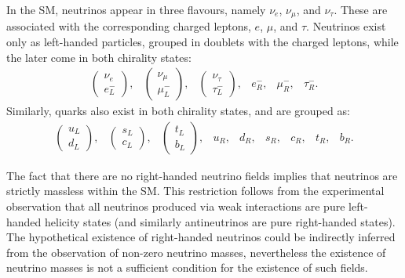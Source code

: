In the SM, neutrinos appear in three flavours, namely $\nu_{e}$, $\nu_{\mu}$, and $\nu_{\tau}$. These are associated with the corresponding charged leptons, $e$, $\mu$, and $\tau$. Neutrinos exist only as left-handed particles, grouped in doublets with the charged leptons, while the later come in both chirality states:
\begin{equation}
	\begin{array}{cccccc}
		\begin{pmatrix}\nu_{e}\\e^{-}_{L}\end{pmatrix},&\begin{pmatrix}\nu_{\mu}\\\mu^{-}_{L}\end{pmatrix},&\begin{pmatrix}\nu_{\tau}\\\tau^{-}_{L}\end{pmatrix},&e^{-}_{R},&\mu^{-}_{R},&\tau^{-}_{R}.
	\end{array}
\end{equation}
Similarly, quarks also exist in both chirality states, and are grouped as:
\begin{equation}
	\begin{array}{ccccccccc}
		\begin{pmatrix}u_{L}\\d_{L}\end{pmatrix},&\begin{pmatrix}s_{L}\\c_{L}\end{pmatrix},&\begin{pmatrix}t_{L}\\b_{L}\end{pmatrix},&u_{R},&d_{R},&s_{R},&c_{R},&t_{R},&b_{R}.
	\end{array}
\end{equation}

The fact that there are no right-handed neutrino fields implies that neutrinos are strictly massless within the SM. This restriction follows from the experimental observation that all neutrinos produced via weak interactions are pure left-handed helicity states (and similarly antineutrinos are pure right-handed states). The hypothetical existence of right-handed neutrinos could be indirectly inferred from the observation of non-zero neutrino masses, nevertheless the existence of neutrino masses is not a sufficient condition for the existence of such fields.

